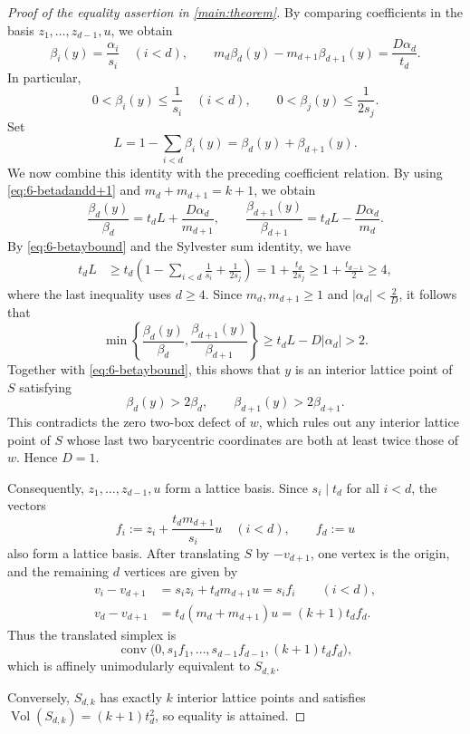 \documentclass[reqno, 11pt]{article}
\numberwithin{equation}{section}
\theoremstyle{definition}
\begin{document}
\begin{proof}[Proof of the equality assertion in \cref{main:theorem}]
By comparing coefficients in the basis $z_1,\ldots,z_{d-1},u$, we obtain
\[
\beta_i(y)=\frac{\alpha_i}{s_i}\quad(i<d),
\qquad
m_d\beta_d(y)-m_{d+1}\beta_{d+1}(y)
=\frac{D\alpha_d}{t_d}.
\]
In particular,
\begin{equation}\label{eq:6-betaybound}
0<\beta_i(y)\le\frac1{s_i}\quad(i<d),
\qquad
0<\beta_j(y)\le\frac1{2s_j}.
\end{equation}
Set
\[
L=1-\sum_{i<d}\beta_i(y)
=\beta_d(y)+\beta_{d+1}(y).
\]
We now combine this identity with the preceding coefficient relation. By using \eqref{eq:6-betadandd+1} and $m_d+m_{d+1}=k+1$, we obtain
\[
\frac{\beta_d(y)}{\beta_d}
=t_dL+\frac{D\alpha_d}{m_{d+1}},
\qquad
\frac{\beta_{d+1}(y)}{\beta_{d+1}}
=t_dL-\frac{D\alpha_d}{m_d}.
\]
By \eqref{eq:6-betaybound} and the Sylvester sum identity, we have
\begin{equation}\label{eq:eq:remaining-mass}
\begin{aligned}
t_dL
&\ge t_d\left(1-\sum_{i<d}\frac1{s_i}+\frac1{2s_j}\right)=1+\frac{t_d}{2s_j}
\ge1+\frac{t_{d-1}}2\ge4,
\end{aligned}
\end{equation}
where the last inequality uses $d\ge4$. Since $m_d,m_{d+1}\ge1$ and $|\alpha_d|<\frac2D$, it follows that
\[
\min\left\{
\frac{\beta_d(y)}{\beta_d},
\frac{\beta_{d+1}(y)}{\beta_{d+1}}
\right\}
\ge t_dL-D|\alpha_d|>2.
\]
Together with \eqref{eq:6-betaybound}, this shows that $y$ is an interior lattice point of $S$ satisfying
\[
\beta_d(y)>2\beta_d,\qquad
\beta_{d+1}(y)>2\beta_{d+1}.
\]
This contradicts the zero two-box defect of $w$, which rules out any interior lattice point of $S$ whose last two barycentric coordinates are both at least twice those of $w$. Hence $D=1$.


Consequently, $z_1,\ldots,z_{d-1},u$ form a lattice basis. Since $s_i\mid t_d$ for all $i<d$, the vectors
\[
f_i:=z_i+\frac{t_dm_{d+1}}{s_i}u\quad(i<d),
\qquad f_d:=u
\]
also form a lattice basis. After translating $S$ by $-v_{d+1}$, one vertex is the origin, and the remaining $d$ vertices are given by
\[
\begin{aligned}
v_i-v_{d+1}
&=s_iz_i+t_dm_{d+1}u=s_if_i
\qquad(i<d),\\
v_d-v_{d+1}
&=t_d(m_d+m_{d+1})u=(k+1)t_df_d.
\end{aligned}
\]
Thus the translated simplex is
\[
\operatorname{conv}\bigl(0,s_1f_1,\ldots,s_{d-1}f_{d-1},
(k+1)t_df_d\bigr),
\]
which is affinely unimodularly equivalent to $S_{d,k}$. 

Conversely, \(S_{d,k}\) has exactly \(k\) interior lattice points and satisfies \(\operatorname{Vol}(S_{d,k})=(k+1)t_d^2\), so equality is attained.
\end{proof}
\end{document}
